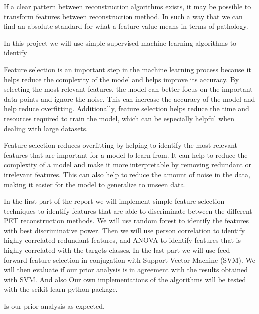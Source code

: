 If a clear pattern between reconstruction algorithms exists, it may be possible to
transform features between reconstruction method. In such a way that we can find an 
absolute standard for what a feature value means in terms of pathology. 


In this project we will use simple supervised machine learning algorithms to
identify  


Feature selection is an important step in the machine learning process because
it helps reduce the complexity of the model and helps improve its accuracy. By
selecting the most relevant features, the model can better focus on the
important data points and ignore the noise. This can increase the accuracy of
the model and help reduce overfitting. Additionally, feature selection helps
reduce the time and resources required to train the model, which can be
especially helpful when dealing with large datasets.

Feature selection reduces overfitting by helping to identify the most relevant
features that are important for a model to learn from. It can help to reduce
the complexity of a model and make it more interpretable by removing redundant
or irrelevant features. This can also help to reduce the amount of noise in the
data, making it easier for the model to generalize to unseen data.




In the first part of the report we will implement simple feature selection
techniques to identify features that are able to discriminate between the
different PET reconstruction methods. We will use random forest to identify the
features with best discriminative power. Then we will use person correlation to
identify highly correlated redundant features, and ANOVA to identify
features that is highly correlated with the targets classes. In the last part we will
use feed forward feature selection in conjugation with Support Vector Machine
(SVM). We will then evaluate if our prior analysis is in agreement with the
results obtained with SVM. And also  Our own implementations of the algorithms will be
tested with the scikit learn python package. 

Is our prior analysis as expected. 




